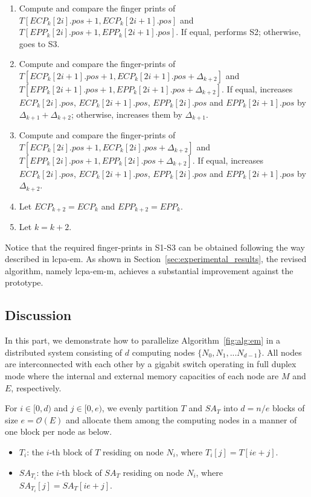 \documentclass{llncs}
\begin{document}
\begin{enumerate}[S1.]
\item Compute and compare the finger prints of $T[ECP_k[2i].pos+1,ECP_k[2i+1].pos]$ and $T[EPP_k[2i].pos+1,EPP_k[2i+1].pos]$. If equal, performs S2; otherwise, goes to S3.
\item Compute and compare the finger-prints of $T[ECP_k[2i+1].pos+1,ECP_k[2i+1].pos+\Delta_{k+2}]$ and $T[EPP_k[2i+1].pos+1,EPP_k[2i+1].pos+\Delta_{k+2}]$. If equal, increases $ECP_k[2i].pos$, $ECP_k[2i+1].pos$, $EPP_k[2i].pos$ and $EPP_k[2i+1].pos$ by $\Delta_{k+1}+\Delta_{k+2}$; otherwise, increases them by $\Delta_{k+1}$.
\item Compute and compare the finger-prints of $T[ECP_k[2i].pos+1,ECP_k[2i].pos+\Delta_{k+2}]$ and $T[EPP_k[2i].pos+1,EPP_k[2i].pos+\Delta_{k+2}]$. If equal, increases $ECP_k[2i].pos$, $ECP_k[2i+1].pos$, $EPP_k[2i].pos$ and $EPP_k[2i+1].pos$ by $\Delta_{k+2}$.
\item Let $ECP_{k+2}=ECP_{k}$ and $EPP_{k+2}=EPP_{k}$.
\item Let $k = k+2$.
\end{enumerate}

Notice that the required finger-prints in S1-S3 can be obtained following the way described in {lcpa-em}. As shown in Section~\ref{sec:experimental_results}, the revised algorithm, namely {lcpa-em-m}, achieves a substantial improvement against the prototype.

\subsection{Discussion}\label{subsec:discussions}

In this part, we demonstrate how to parallelize Algorithm~\ref{fig:alg:em} in a distributed system consisting of $d$ computing nodes $\{N_0, N_1, ...N_{d-1}\}$. All nodes are interconnected with each other by a gigabit switch operating in full duplex mode where the internal and external memory capacities of each node are $M$ and $E$, respectively.

For $i\in [0,d)$ and $j\in [0,e)$, we evenly partition $T$ and $SA_T$ into $d=n/e$ blocks of size $e=\mathcal{O}(E)$ and allocate them among the computing nodes in a manner of one block per node as below.

\begin{itemize}
\item $T_i$: the $i$-th block of $T$ residing on node $N_i$, where $T_i[j] = T[ie+j]$.
\item $SA_{T_i}$: the $i$-th block of $SA_T$ residing on node $N_i$, where $SA_{T_i}[j] = SA_T[ie+j]$.
\end{itemize}
\end{document}

